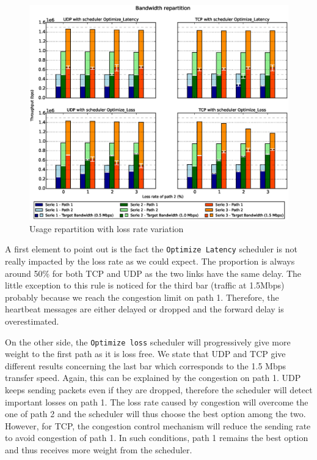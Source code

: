\begin{figure}[!ht]
\centering
\includegraphics[width=\textwidth]{images/xp/graph2.eps}
\caption{Usage repartition with loss rate variation}
\label{fig:dynloss}
\end{figure}

A first element to point out is the fact the \texttt{Optimize Latency} scheduler is not really impacted by the loss rate as we could expect. The proportion is always around 50\% for both TCP and UDP as the two links have the same delay. The little exception to this rule is noticed for the third bar (traffic at 1.5Mbps) probably because we reach the congestion limit on path 1. Therefore, the heartbeat messages are either delayed or dropped and the forward delay is overestimated.

On the other side, the \texttt{Optimize loss} scheduler will progressively give more weight to the first path as it is loss free. We state that UDP and TCP give different results concerning the last bar which corresponds to the 1.5 Mbps transfer speed. Again, this can be explained by the congestion on path 1. UDP keeps sending packets even if they are dropped, therefore the scheduler will detect important losses on path 1. The loss rate caused by congestion will overcome the one of path 2 and the scheduler will thus choose the best option among the two. However, for TCP, the congestion control mechanism will reduce the sending rate to avoid congestion of path 1. In such conditions, path 1 remains the best option and thus receives more weight from the scheduler.


